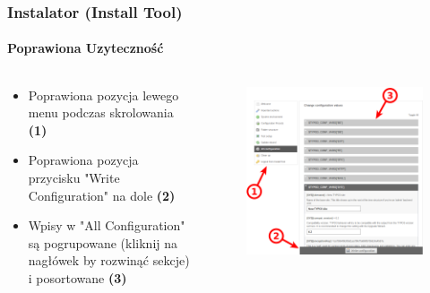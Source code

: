 
\begin{frame}[fragile]
	\frametitle{Instalator (Install Tool)}
	\framesubtitle{Poprawiona Uzyteczność}

	\begin{columns}[T]
		\begin{column}{.5\textwidth}

			\begin{itemize}
				\item Poprawiona pozycja lewego \newline
					menu podczas skrolowania
					\begingroup\color{typo3red}\textbf{(1)}\endgroup
				\item Poprawiona pozycja przycisku "Write Configuration" na dole
					\begingroup\color{typo3red}\textbf{(2)}\endgroup
				\item Wpisy w "All Configuration" są pogrupowane (kliknij na nagłówek by rozwinąć sekcje) i posortowane
					\begingroup\color{typo3red}\textbf{(3)}\endgroup
			\end{itemize}

		\end{column}
		\begin{column}{.5\textwidth}

			\begin{figure}\vspace*{-0.4cm}
				\includegraphics[width=0.8\linewidth]{Images/InstallTool/ImprovedUsability.png}
			\end{figure}

		\end{column}
	\end{columns}

\end{frame}

